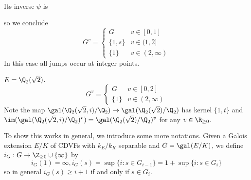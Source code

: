 \documentclass[a4paper]{article}
\begin{document}
\begin{eg}
\begin{center}
  \end{center}
  Its inverse \(\psi\) is
   \begin{center}
  \end{center}
  so we conclude
  \[
    G^v =
    \begin{cases}
      G & v \in [0, 1] \\
      \{1, s\} & v \in (1, 2] \\
      \{1\} & v \in (2, \infty)
    \end{cases}
  \]
  In this case all jumps occur at integer points.
\end{eg}

\begin{eg}
  \(E = \Q_2(\sqrt 2)\).
  \[
    G^v =
    \begin{cases}
      G & v \in [0, 2] \\
      \{1\} & v \in (2, \infty)
    \end{cases}
  \]
  Note the map \(\gal(\Q_2(\sqrt 2, i)/\Q_2) \to \gal(\Q_2(\sqrt 2)/\Q_2)\) has kernel \(\{1, t\}\) and \(\im(\gal(\Q_2(\sqrt 2, i)/\Q_2)^v) = \gal(\Q_2(\sqrt 2)/\Q_2)^v\) for any \(v \in \R_{\geq 0}\).
\end{eg}

To show this works in general, we introduce some more notations. Given a Galois extension \(E/K\) of CDVFs with \(k_E/k_K\) separable and \(G = \gal(E/K)\), we define \(i_G: G \to \Z_{\geq 0} \cup \{\infty\}\) by
\[
  i_G(1) = \infty, i_G(s) = \sup \{i: s \in G_{i - 1}\} = 1 + \sup \{i: s \in G_i\}
\]
so in general \(i_G(s) \geq i + 1\) if and only if \(s \in G_i\).
\end{document}

